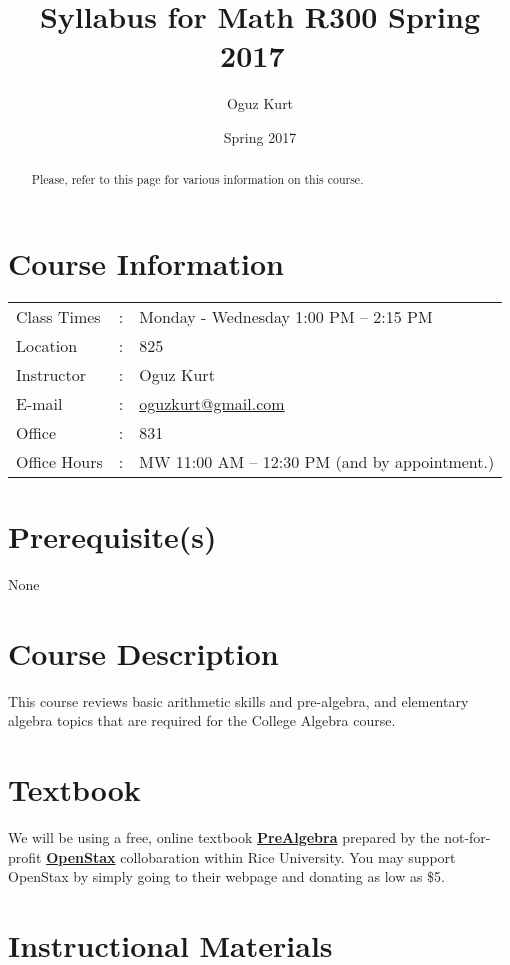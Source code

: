 \documentclass[handout]{ximera}
\title{Syllabus for Math R300 \hfill
Spring 2017 \hfill \,}
\author{Oguz Kurt}
\date{Spring 2017}
\begin{document}
\begin{abstract}
Please, refer to this page for various information on this course.
\end{abstract} 
\maketitle

\section*{Course Information}
\begin{tabular}[c]{lll}
Class Times & : &  Monday - Wednesday 1:00 PM -- 2:15 PM  \\
Location & : &  825  \\
Instructor & : &  Oguz Kurt  \\
E-mail & : &   \href{mailto:oguzkurt@gmail.com}{oguzkurt@gmail.com} \\
Office & : & 831 \\
Office Hours & : & MW 11:00 AM -- 12:30 PM (and by appointment.)
\end{tabular}

\section*{Prerequisite(s)}
None
\section*{Course Description}

This course reviews basic arithmetic skills and pre-algebra, and elementary algebra topics that are required for the College Algebra course.

\section*{Textbook}

We will be using a free, online textbook \href{https://openstax.org/details/books/prealgebra}{\bf \Large PreAlgebra} prepared by the not-for-profit \href{https://www.openstax.org}{\bf OpenStax} collobaration within Rice University. You may support OpenStax by simply going to their webpage and donating as low as \$5.

\section*{Instructional Materials}
\end{document}
